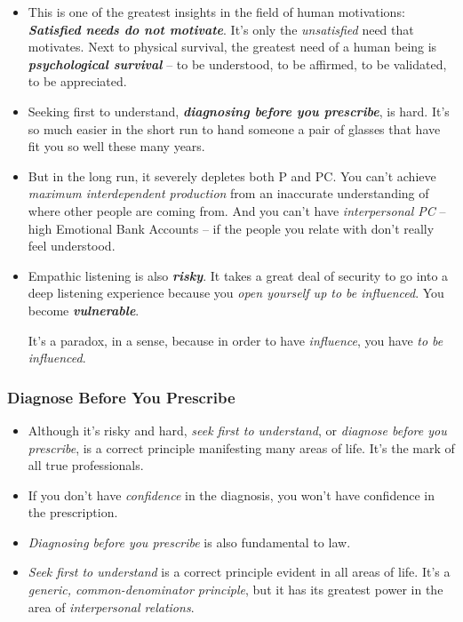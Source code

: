 \documentclass[11pt]{article}
\begin{document}
\begin{itemize}
\item This is one of the greatest insights in the field of human motivations: \emph{\textbf{Satisfied needs do not motivate}}. It's only the \emph{unsatisfied} need that motivates. Next to physical survival, the greatest need of a human being is \emph{\textbf{psychological survival}} -- to be understood, to be affirmed, to be validated, to be appreciated.

\item Seeking first to understand, \emph{\textbf{diagnosing before you prescribe}}, is hard. It's so much easier in the short run to hand someone a pair of glasses that have fit you so well these many years.

\item But in the long run, it severely depletes both P and PC. You can't achieve \emph{maximum interdependent production} from an inaccurate understanding of where other people are coming from. And you can't have \emph{interpersonal PC} -- high Emotional Bank Accounts -- if the people you relate with don't really feel understood.

\item Empathic listening is also \emph{\textbf{risky}}. It takes a great deal of security to go into a deep listening experience because you \emph{open yourself up to be influenced}. You become \emph{\textbf{vulnerable}}.

It's a paradox, in a sense, because in order to have \emph{influence}, you have \emph{to be influenced}. 
\end{itemize}
\subsubsection{Diagnose Before You Prescribe}
\begin{itemize}
\item Although it's risky and hard, \emph{seek first to understand}, or \emph{diagnose before you prescribe}, is a correct principle manifesting many areas of life. It's the mark of all true professionals.

\item If you don't have \emph{confidence} in the diagnosis, you won't have confidence in the prescription.

\item \emph{Diagnosing before you prescribe} is also fundamental to law. 

\item \emph{Seek first to understand} is a correct principle evident in all areas of life. It's a \emph{generic, common-denominator principle}, but it has its greatest power in the area of \emph{interpersonal relations}.
\end{itemize}
\end{document}
